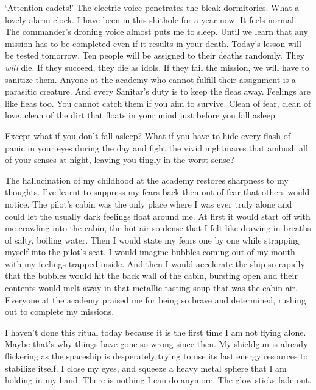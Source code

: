 \hsep

\begin{flashback}
`Attention cadets!' The electric voice penetrates the bleak
dormitories. What a lovely alarm clock. I have been in this shithole
for a year now. It feels normal. The commander's droning voice almost
puts me to sleep. Until we learn that any mission has to be completed
even if it results in your death. Today's lesson will be tested
tomorrow. Ten people will be assigned to their deaths randomly. They
\emph{will} die. If they succeed, they die as idols. If they fail the
mission, we will have to sanitize them. Anyone at the academy who
cannot fulfill their assignment is a parasitic creature. And every
Sanitar's duty is to keep the fleas away. Feelings are like fleas
too. You cannot catch them if you aim to survive. Clean of fear, clean
of love, clean of the dirt that floats in your mind just before you
fall asleep.

Except what if you don't fall asleep? What if you have
to hide every flash of panic in your eyes during the day and fight the
vivid nightmares that ambush all of your senses at night, leaving you
tingly in the worst sense?
\end{flashback}

\hsep

The hallucination of my childhood at the academy restores sharpness to
my thoughts. I've learnt to suppress my fears back then out of fear
that others would notice. The pilot's cabin was the only place where I
was ever truly alone and could let the usually dark feelings float
around me. At first it would start off with me crawling into the
cabin, the hot air so dense that I felt like drawing in breaths of
salty, boiling water. Then I would state my fears one by one while
strapping myself into the pilot's seat. I would imagine bubbles coming
out of my mouth with my feelings trapped inside. And then I would
accelerate the ship so rapidly that the bubbles would hit the back
wall of the cabin, bursting open and their contents would melt away in
that metallic tasting soup that was the cabin air. Everyone at the
academy praised me for being so brave and determined, rushing out to
complete my missions.

I haven't done this ritual today because it is the first time I am not
flying alone. Maybe that's why things have gone so wrong since
then. My shieldgun is already flickering as the spaceship is
desperately trying to use its last energy resources to stabilize
itself. I close my eyes, and squeeze a heavy metal sphere that I am
holding in my hand. There is nothing I can do anymore. The glow sticks
fade out.

